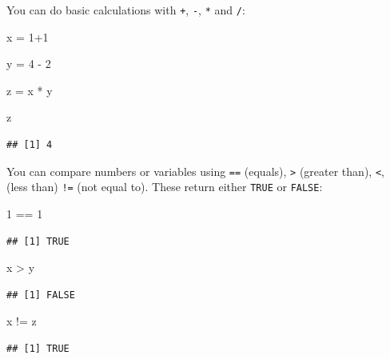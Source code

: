 \documentclass[
]{book}
\newenvironment{Shaded}{\begin{snugshade}}{\end{snugshade}}
\newcommand{\DecValTok}[1]{\textcolor[rgb]{0.00,0.00,0.81}{#1}}
\newcommand{\NormalTok}[1]{#1}
\newcommand{\OtherTok}[1]{\textcolor[rgb]{0.56,0.35,0.01}{#1}}
\newcommand{\SpecialCharTok}[1]{\textcolor[rgb]{0.00,0.00,0.00}{#1}}
\begin{document}
You can do basic calculations with \texttt{+}, \texttt{-}, \texttt{*} and \texttt{/}:

\begin{Shaded}
\begin{Highlighting}[]
\NormalTok{x }\OtherTok{=} \DecValTok{1}\SpecialCharTok{+}\DecValTok{1}

\NormalTok{y }\OtherTok{=} \DecValTok{4} \SpecialCharTok{{-}} \DecValTok{2}

\NormalTok{z }\OtherTok{=}\NormalTok{ x }\SpecialCharTok{*}\NormalTok{ y}

\NormalTok{z}
\end{Highlighting}
\end{Shaded}

\begin{verbatim}
## [1] 4
\end{verbatim}

You can compare numbers or variables using \texttt{==} (equals), \texttt{\textgreater{}} (greater than), \texttt{\textless{}}, (less than) \texttt{!=} (not equal to). These return either \texttt{TRUE} or \texttt{FALSE}:

\begin{Shaded}
\begin{Highlighting}[]
\DecValTok{1} \SpecialCharTok{==} \DecValTok{1}
\end{Highlighting}
\end{Shaded}

\begin{verbatim}
## [1] TRUE
\end{verbatim}

\begin{Shaded}
\begin{Highlighting}[]
\NormalTok{x }\SpecialCharTok{\textgreater{}}\NormalTok{ y}
\end{Highlighting}
\end{Shaded}

\begin{verbatim}
## [1] FALSE
\end{verbatim}

\begin{Shaded}
\begin{Highlighting}[]
\NormalTok{x }\SpecialCharTok{!=}\NormalTok{ z}
\end{Highlighting}
\end{Shaded}

\begin{verbatim}
## [1] TRUE
\end{verbatim}
\end{document}
